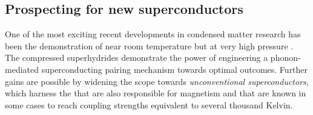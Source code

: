
\subsection*{Prospecting for new superconductors}
\noindent
One of the most exciting recent developments in condensed matter research has been the
demonstration of  near room temperature but at very high pressure
\cite{snider20,drozdov19,somayazulu19}. 
The compressed superhydrides demonstrate the power of engineering a phonon-mediated superconducting pairing mechanism towards optimal outcomes. Further gains are possible by widening the scope towards 
\emph{unconventional superconductors}, which harness the  that are also responsible for magnetism and that are
known in some cases to reach coupling strengths equivalent to several
thousand Kelvin. %

